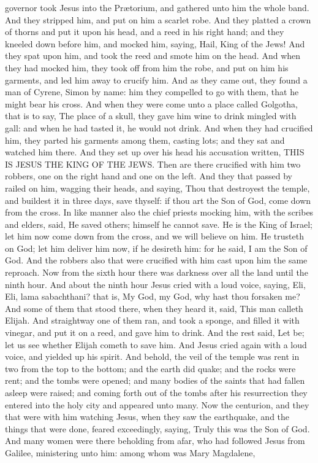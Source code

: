 governor took Jesus into the Prætorium, and gathered unto him the whole band. And they stripped him, and put on him a scarlet robe. And they platted a crown of thorns and put it upon his head, and a reed in his right hand; and they kneeled down before him, and mocked him, saying, Hail, King of the Jews! And they spat upon him, and took the reed and smote him on the head. And when they had mocked him, they took off from him the robe, and put on him his garments, and led him away to crucify him.  And as they came out, they found a man of Cyrene, Simon by name: him they compelled to go with them, that he might bear his cross.  And when they were come unto a place called Golgotha, that is to say, The place of a skull, they gave him wine to drink mingled with gall: and when he had tasted it, he would not drink. And when they had crucified him, they parted his garments among them, casting lots; and they sat and watched him there. And they set up over his head his accusation written, THIS IS JESUS THE KING OF THE JEWS. Then are there crucified with him two robbers, one on the right hand and one on the left. And they that passed by railed on him, wagging their heads, and saying, Thou that destroyest the temple, and buildest it in three days, save thyself: if thou art the Son of God, come down from the cross. In like manner also the chief priests mocking him, with the scribes and elders, said, He saved others; himself he cannot save. He is the King of Israel; let him now come down from the cross, and we will believe on him. He trusteth on God; let him deliver him now, if he desireth him: for he said, I am the Son of God. And the robbers also that were crucified with him cast upon him the same reproach.  Now from the sixth hour there was darkness over all the land until the ninth hour. And about the ninth hour Jesus cried with a loud voice, saying, Eli, Eli, lama sabachthani? that is, My God, my God, why hast thou forsaken me? And some of them that stood there, when they heard it, said, This man calleth Elijah. And straightway one of them ran, and took a sponge, and filled it with vinegar, and put it on a reed, and gave him to drink. And the rest said, Let be; let us see whether Elijah cometh to save him. And Jesus cried again with a loud voice, and yielded up his spirit. And behold, the veil of the temple was rent in two from the top to the bottom; and the earth did quake; and the rocks were rent; and the tombs were opened; and many bodies of the saints that had fallen asleep were raised; and coming forth out of the tombs after his resurrection they entered into the holy city and appeared unto many. Now the centurion, and they that were with him watching Jesus, when they saw the earthquake, and the things that were done, feared exceedingly, saying, Truly this was the Son of God. And many women were there beholding from afar, who had followed Jesus from Galilee, ministering unto him: among whom was Mary Magdalene, 
